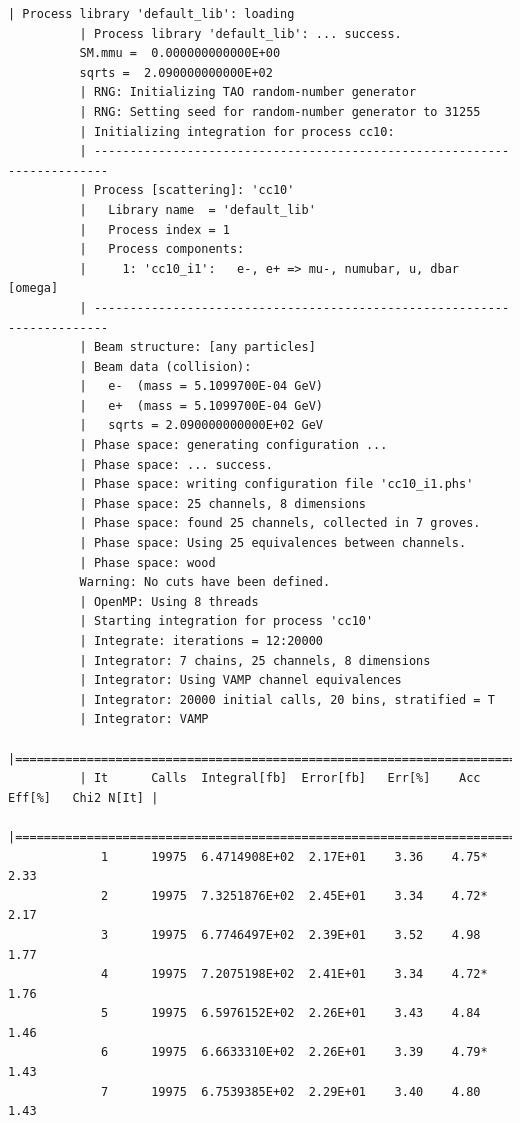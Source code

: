 \documentclass[12pt]{book}
\begin{document}
\begin{scriptsize}
\begin{Verbatim}[frame=single]
          | Process library 'default_lib': loading
          | Process library 'default_lib': ... success.
          SM.mmu =  0.000000000000E+00
          sqrts =  2.090000000000E+02
          | RNG: Initializing TAO random-number generator
          | RNG: Setting seed for random-number generator to 31255
          | Initializing integration for process cc10:
          | ------------------------------------------------------------------------
          | Process [scattering]: 'cc10'
          |   Library name  = 'default_lib'
          |   Process index = 1
          |   Process components:
          |     1: 'cc10_i1':   e-, e+ => mu-, numubar, u, dbar [omega]
          | ------------------------------------------------------------------------
          | Beam structure: [any particles]
          | Beam data (collision):
          |   e-  (mass = 5.1099700E-04 GeV)
          |   e+  (mass = 5.1099700E-04 GeV)
          |   sqrts = 2.090000000000E+02 GeV
          | Phase space: generating configuration ...
          | Phase space: ... success.
          | Phase space: writing configuration file 'cc10_i1.phs'
          | Phase space: 25 channels, 8 dimensions
          | Phase space: found 25 channels, collected in 7 groves.
          | Phase space: Using 25 equivalences between channels.
          | Phase space: wood
          Warning: No cuts have been defined.
          | OpenMP: Using 8 threads
          | Starting integration for process 'cc10'
          | Integrate: iterations = 12:20000
          | Integrator: 7 chains, 25 channels, 8 dimensions
          | Integrator: Using VAMP channel equivalences
          | Integrator: 20000 initial calls, 20 bins, stratified = T
          | Integrator: VAMP
          |=============================================================================|
          | It      Calls  Integral[fb]  Error[fb]   Err[%]    Acc  Eff[%]   Chi2 N[It] |
          |=============================================================================|
             1      19975  6.4714908E+02  2.17E+01    3.36    4.75*   2.33
             2      19975  7.3251876E+02  2.45E+01    3.34    4.72*   2.17
             3      19975  6.7746497E+02  2.39E+01    3.52    4.98    1.77
             4      19975  7.2075198E+02  2.41E+01    3.34    4.72*   1.76
             5      19975  6.5976152E+02  2.26E+01    3.43    4.84    1.46
             6      19975  6.6633310E+02  2.26E+01    3.39    4.79*   1.43
             7      19975  6.7539385E+02  2.29E+01    3.40    4.80    1.43

\end{Verbatim}
\end{scriptsize}
\end{document}
